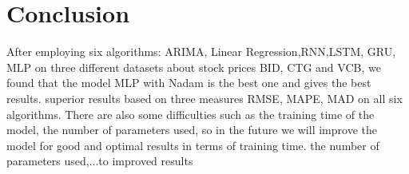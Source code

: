\documentclass{ieeeojies}
\begin{document}
\section{Conclusion}
After employing six algorithms: ARIMA, Linear Regression,RNN,LSTM, GRU, MLP on three different datasets about stock prices BID, CTG and VCB, we found that the model MLP with Nadam is the best one and gives the best results. superior results based on three measures RMSE, MAPE, MAD on all six algorithms.  
There are also some difficulties such as the training time of 
the model, the number of parameters used, so in the future we 
will improve the model for good and optimal results in terms 
of training time. the number of parameters used,...to 
improved results
\end{document}
